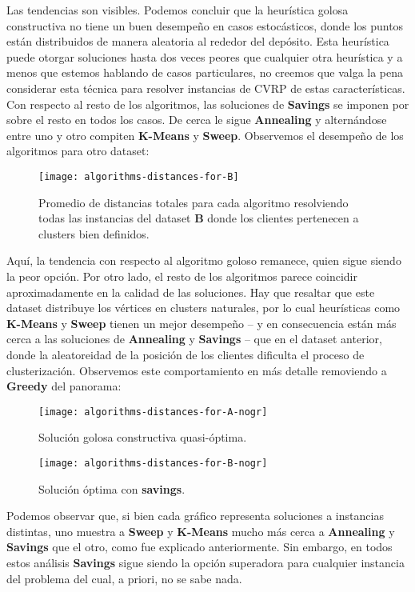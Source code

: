 Las tendencias son visibles. Podemos concluir que la heurística golosa constructiva no tiene un buen desempeño en casos estocásticos, donde los puntos están distribuidos de manera aleatoria al rededor del depósito. Esta heurística puede otorgar soluciones hasta dos veces peores que cualquier otra heurística y a menos que estemos hablando de casos particulares, no creemos que valga la pena considerar esta técnica para resolver instancias de CVRP de estas características. Con respecto al resto de los algoritmos, las soluciones de \textbf{Savings} se imponen por sobre el resto en todos los casos. De cerca le sigue \textbf{Annealing} y alternándose entre uno y otro compiten \textbf{K-Means} y \textbf{Sweep}. Observemos el desempeño de los algoritmos para otro dataset:

\begin{figure}[H]
 \centering
 \texttt{[image: algorithms-distances-for-B]}
 \caption{\footnotesize Promedio de distancias totales para cada algoritmo resolviendo todas las instancias del dataset \textbf{B} donde los clientes pertenecen a clusters bien definidos.}
 \label{fig:algorithms-distances-for-B}
\end{figure}

Aquí, la tendencia con respecto al algoritmo goloso remanece, quien sigue siendo la peor opción. Por otro lado, el resto de los algoritmos parece coincidir aproximadamente en la calidad de las soluciones. Hay que resaltar que este dataset distribuye los vértices en clusters naturales, por lo cual heurísticas como \textbf{K-Means} y \textbf{Sweep} tienen un mejor desempeño – y en consecuencia están más cerca a las soluciones de \textbf{Annealing} y \textbf{Savings} – que en el dataset anterior, donde la aleatoreidad de la posición de los clientes dificulta el proceso de clusterización. Observemos este comportamiento en más detalle removiendo a \textbf{Greedy} del panorama:

\begin{figure}[H]
	\centering
	\begin{minipage}{0.48\textwidth}
		\centering
		\texttt{[image: algorithms-distances-for-A-nogr]}
		\caption{\footnotesize Solución golosa constructiva quasi-óptima.}
		\label{fig:algorithms-distances-for-A-nogr}
	\end{minipage}%
	\hspace{0.03\textwidth}
	\begin{minipage}{0.48\textwidth}
		\centering
		\texttt{[image: algorithms-distances-for-B-nogr]}
		\caption{\footnotesize Solución óptima con \textbf{savings}.}
		\label{fig:algorithms-distances-for-B-nogr}
	\end{minipage}%
\end{figure}

Podemos observar que, si bien cada gráfico representa soluciones a instancias distintas, uno muestra a \textbf{Sweep} y \textbf{K-Means} mucho más cerca a \textbf{Annealing} y \textbf{Savings} que el otro, como fue explicado anteriormente. Sin embargo, en todos estos análisis \textbf{Savings} sigue siendo la opción superadora para cualquier instancia del problema del cual, a priori, no se sabe nada.
